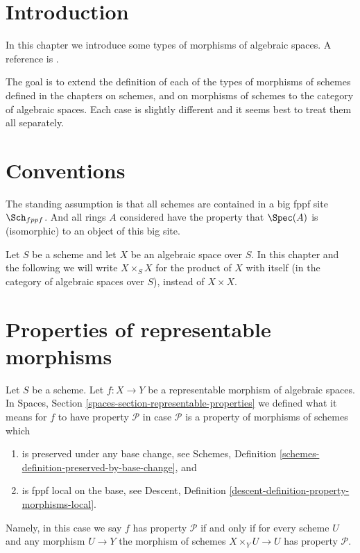 \section{Introduction}
\label{spaces-morphisms-section-introduction}
In this chapter we introduce some types of morphisms of algebraic spaces.
A reference is \cite{Kn}.

\medskip\noindent
The goal is to extend the definition of each of the types of morphisms of
schemes defined in the chapters on schemes, and on morphisms of schemes
to the category of algebraic spaces. Each case is slightly different and
it seems best to treat them all separately.

\section{Conventions}
\label{spaces-morphisms-section-conventions}
The standing assumption is that all schemes are contained in
a big fppf site $\Sch_{fppf}$. And all rings $A$ considered
have the property that $\Spec(A)$ is (isomorphic) to an
object of this big site.

\medskip\noindent
Let $S$ be a scheme and let $X$ be an algebraic space over $S$.
In this chapter and the following we will write $X \times_S X$
for the product of $X$ with itself (in the category of algebraic
spaces over $S$), instead of $X \times X$.

\section{Properties of representable morphisms}
\label{spaces-morphisms-section-representable}
Let $S$ be a scheme.
Let $f : X \to Y$ be a representable morphism of algebraic spaces. In
Spaces, Section \ref{spaces-section-representable-properties}
we defined what it means for $f$ to
have property $\mathcal{P}$ in case $\mathcal{P}$ is a property
of morphisms of schemes which
\begin{enumerate}
\item is preserved under any base change,
see Schemes, Definition \ref{schemes-definition-preserved-by-base-change},
and
\item is fppf local on the base, see
Descent, Definition \ref{descent-definition-property-morphisms-local}.
\end{enumerate}
Namely, in this case we say $f$ has property $\mathcal{P}$ if and only
if for every scheme $U$ and any morphism $U \to Y$ the morphism of schemes
$X \times_Y U \to U$ has property $\mathcal{P}$.

